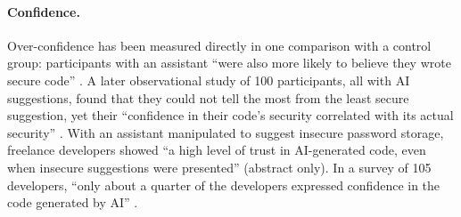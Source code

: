 \paragraph{Confidence.}
Over-confidence has been measured directly in one comparison with a control
group: participants with an assistant \enquote{were also more likely to
believe they wrote secure code} \autocite[abstract]{Perry2023Users}.
A later observational study of 100 participants, all with AI suggestions,
found that they could not tell the most from the least secure suggestion,
yet their \enquote{confidence in their code's security correlated with its
actual security} \autocite[abstract]{Khalid2026Trust}.
With an assistant manipulated to suggest insecure password storage,
freelance developers showed \enquote{a high level of trust in AI-generated
code, even when insecure suggestions were presented}
\autocite{Serafini2025Manipulated} (abstract only).
In a survey of 105 developers, \enquote{only about a quarter of the
developers expressed confidence in the code generated by AI}
\autocite[abstract]{Kudriavtseva2025Perceptions}.

